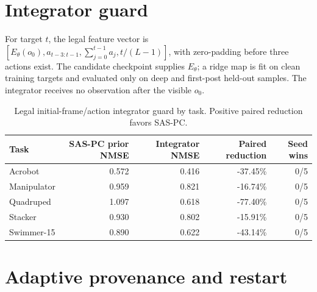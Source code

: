 \section{Integrator guard}\label{integrator-guard}

For target \(t\), the legal feature vector is \([E_\theta(o_0),a_{t-3:t-1},\sum_{j=0}^{t-1}a_j,t/(L-1)]\),
with zero-padding before three actions exist. The candidate checkpoint
supplies \(E_\theta\); a ridge map is fit on clean training targets and
evaluated only on deep and first-post held-out samples. The integrator
receives no observation after the visible \(o_0\).

\begin{table}[H]
\centering
\caption{Legal initial-frame/action integrator guard by task. Positive paired reduction favors SAS-PC.}
\label{tbl:integrator-guard}
\small
\begin{tabular}{@{}lrrrr@{}}
\toprule
\textcolor{NVIDIADark}{\textbf{Task}} & \textcolor{NVIDIADark}{\textbf{SAS-PC prior NMSE}} & \textcolor{NVIDIADark}{\textbf{Integrator NMSE}} & \textcolor{NVIDIADark}{\textbf{Paired reduction}} & \textcolor{NVIDIADark}{\textbf{Seed wins}} \\
\midrule
Acrobot & 0.572 & 0.416 & -37.45\% & 0/5 \\
Manipulator & 0.959 & 0.821 & -16.74\% & 0/5 \\
Quadruped & 1.097 & 0.618 & -77.40\% & 0/5 \\
Stacker & 0.930 & 0.802 & -15.91\% & 0/5 \\
Swimmer-15 & 0.890 & 0.622 & -43.14\% & 0/5 \\
\bottomrule
\end{tabular}
\end{table}

\section{Adaptive provenance and
restart}\label{adaptive-provenance-and-restart}


